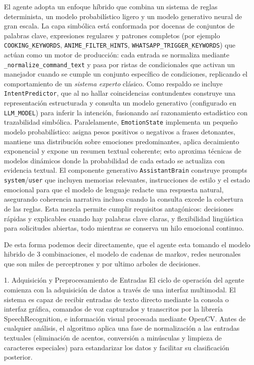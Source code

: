 \documentclass[letterpaper,12pt]{article}
\begin{document}
El agente adopta un enfoque h\'ibrido que combina un sistema de reglas determinista, un modelo probabil\'istico ligero y un modelo generativo neural de gran escala. La capa simb\'olica est\'a conformada por docenas de conjuntos de palabras clave, expresiones regulares y patrones completos (por ejemplo \texttt{COOKING\_KEYWORDS}, \texttt{ANIME\_FILTER\_HINTS}, \texttt{WHATSAPP\_TRIGGER\_KEYWORDS}) que act\'uan como un motor de producci\'on: cada entrada se normaliza mediante \texttt{\_normalize\_command\_text} y pasa por ristas de condicionales que activan un manejador cuando se cumple un conjunto espec\'ifico de condiciones, replicando el comportamiento de un \emph{sistema experto} cl\'asico. Como respaldo se incluye \texttt{IntentPredictor}, que al no hallar coincidencias contundentes construye una representaci\'on estructurada y consulta un modelo generativo (configurado en \texttt{LLM\_MODEL}) para inferir la intenci\'on, fusionando as\'i razonamiento estad\'istico con trazabilidad simb\'olica. Paralelamente, \texttt{EmotionState} implementa un peque\~no modelo probabil\'istico: asigna pesos positivos o negativos a frases detonantes, mantiene una distribuci\'on sobre emociones predominantes, aplica decaimiento exponencial y expone un resumen textual coherente; esto aproxima t\'ecnicas de modelos din\'amicos donde la probabilidad de cada estado se actualiza con evidencia textual. El componente generativo \texttt{AssistantBrain} construye prompts \texttt{system}/\texttt{user} que incluyen memorias relevantes, instrucciones de estilo y el estado emocional para que el modelo de lenguaje redacte una respuesta natural, asegurando coherencia narrativa incluso cuando la consulta excede la cobertura de las reglas. Esta mezcla permite cumplir requisitos antag\'onicos: decisiones r\'apidas y explicables cuando hay palabras clave claras, y flexibilidad lingü\'istica para solicitudes abiertas, todo mientras se conserva un hilo emocional continuo. 

De esta forma podemos decir directamente, que el agente esta tomando el modelo hibrido de 3 combinaciones, el modelo de cadenas de markov, redes neuronales que son miles de perceptrones y por ultimo arboles de decisiones.

1. Adquisición y Preprocesamiento de Entradas El ciclo de operación del agente comienza con la adquisición de datos a través de una interfaz multimodal. El sistema es capaz de recibir entradas de texto directo mediante la consola o interfaz gráfica, comandos de voz capturados y transcritos por la librería SpeechRecognition, e información visual procesada mediante OpenCV. Antes de cualquier análisis, el algoritmo aplica una fase de normalización a las entradas textuales (eliminación de acentos, conversión a minúsculas y limpieza de caracteres especiales) para estandarizar los datos y facilitar su clasificación posterior.
\end{document}
